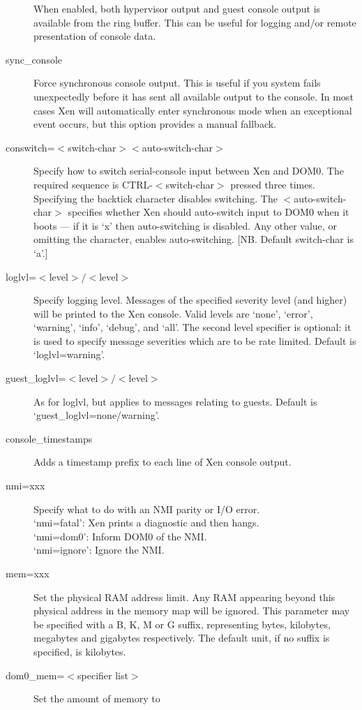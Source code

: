 \documentclass[11pt,twoside,final,openright]{report}
\begin{document}
\begin{description}
  When enabled, both hypervisor output and guest console output
  is available from the ring buffer. This can be useful for logging
  and/or remote presentation of console data.
\item [ sync\_console ] Force synchronous console output. This is
  useful if you system fails unexpectedly before it has sent all
  available output to the console. In most cases Xen will
  automatically enter synchronous mode when an exceptional event
  occurs, but this option provides a manual fallback.
\item [ conswitch=$<$switch-char$><$auto-switch-char$>$ ] Specify how
  to switch serial-console input between Xen and DOM0. The required
  sequence is CTRL-$<$switch-char$>$ pressed three times. Specifying
  the backtick character disables switching.  The
  $<$auto-switch-char$>$ specifies whether Xen should auto-switch
  input to DOM0 when it boots --- if it is `x' then auto-switching is
  disabled.  Any other value, or omitting the character, enables
  auto-switching.  [NB. Default switch-char is `a'.]
\item [ loglvl=$<$level$>/<$level$>$ ]
  Specify logging level. Messages of the specified severity level (and
  higher) will be printed to the Xen console. Valid levels are `none',
  `error', `warning', `info', `debug', and `all'. The second level
  specifier is optional: it is used to specify message severities
  which are to be rate limited. Default is `loglvl=warning'.
\item [ guest\_loglvl=$<$level$>/<$level$>$ ] As for loglvl, but
  applies to messages relating to guests. Default is
  `guest\_loglvl=none/warning'. 
\item [ console\_timestamps ] 
  Adds a timestamp prefix to each line of Xen console output.
\item [ nmi=xxx ]
  Specify what to do with an NMI parity or I/O error. \\
  `nmi=fatal':  Xen prints a diagnostic and then hangs. \\
  `nmi=dom0':   Inform DOM0 of the NMI. \\
  `nmi=ignore': Ignore the NMI.
\item [ mem=xxx ] Set the physical RAM address limit. Any RAM
  appearing beyond this physical address in the memory map will be
  ignored. This parameter may be specified with a B, K, M or G suffix,
  representing bytes, kilobytes, megabytes and gigabytes respectively.
  The default unit, if no suffix is specified, is kilobytes.
\item [ dom0\_mem=$<$specifier list$>$ ] Set the amount of memory to

\end{description}
\end{document}
